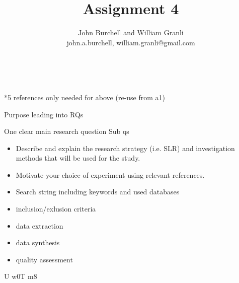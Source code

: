 \documentclass[10pt,twocolumn]{article}
\begin{document}
\title{Assignment 4}

\author{John Burchell and William Granli \\
john.a.burchell, william.granli@gmail.com}


\maketitle
\thispagestyle{empty}




​




*5 references only needed for above (re-use from a1)

Purpose leading into RQs

One clear main research question
Sub qs



\begin{itemize}
\item Describe and explain the research strategy (i.e. SLR) and investigation methods that will be used for the study. 
\item Motivate your choice of experiment using relevant references. 
\item Search string including keywords and used databases
\item inclusion/exlusion criteria
\item data extraction
\item data synthesis
\item quality assessment
\end{itemize}






U w0T m8
\end{document}
